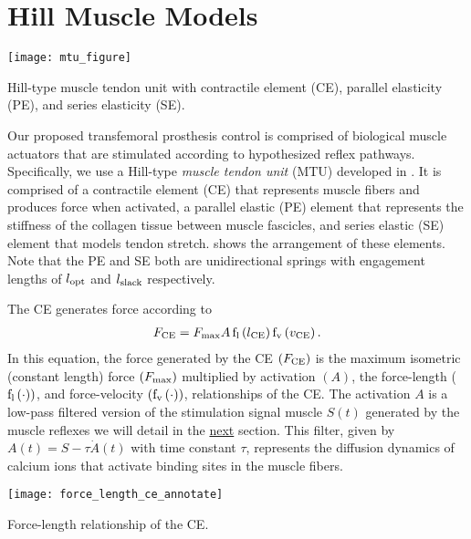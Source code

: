 \section{Hill Muscle Models}\label{sec:neuro_hill_muscle}
\begin{marginfigure}[-0.25in]
    \centering
    \texttt{[image: mtu\_figure]}
    \vspace{-0.4in}
    \caption{Hill-type muscle tendon unit with contractile element (CE),
    parallel elasticity (PE), and series elasticity (SE).}
    \label{fig:hill_type_mtu}
\end{marginfigure}
Our proposed transfemoral prosthesis control is comprised of biological muscle
actuators that are stimulated according to hypothesized reflex pathways.
Specifically, we use a Hill-type \emph{muscle tendon unit} (MTU) developed in
\citet{geyer2010muscle}. It is comprised of a contractile element (CE) that
represents muscle fibers and produces force when activated, a parallel elastic
(PE) element that represents the stiffness of the collagen tissue between muscle
fascicles, and series elastic (SE) element that models tendon stretch.
 shows the arrangement of these elements. Note that the
PE and SE both are unidirectional springs with engagement lengths of
$l_{\textnormal{opt}}$ and $l_{\textnormal{slack}}$ respectively.

The CE generates force according to
\begin{align}
    F_\tn{CE} = F_\tn{max} A \func{f_l}{l_\tn{CE}} \func{f_v}{v_\tn{CE}}.
    \label{eq:hill_ce}
\end{align}
In this equation, the force generated by the CE $(F_{\textnormal{CE}})$ is the maximum
isometric (constant length) force $(F_{\textnormal{max}})$ multiplied by activation $(A)$,
the force-length ($\func{f_l}{\cdot})$, and force-velocity
$(\func{f_v}{\cdot})$, relationships of the CE. The activation $A$ is a low-pass
filtered version of the stimulation signal muscle $S(t)$ generated by the muscle
reflexes we will detail in the \hyperref[sec:neuro_stance_reflexes]{next}
section. This filter, given by $A(t) = S - \tau \dot A(t)$ with time constant
$\tau$, represents the diffusion dynamics of calcium ions that activate binding
sites in the muscle fibers.
\begin{marginfigure}[-1in]
    \centering
    \texttt{[image: force\_length\_ce\_annotate]}
    \vspace{-0.25in}
    \caption{Force-length relationship of the CE.}
    \label{fig:force_length_ce}
\end{marginfigure}


